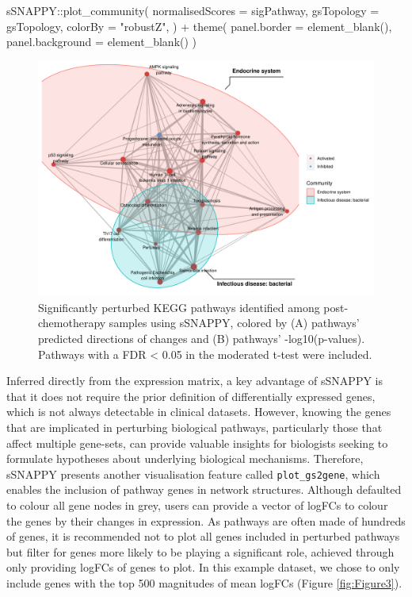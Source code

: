 \documentclass[9pt,a4paper,]{extarticle}
\newenvironment{Shaded}{\begin{snugshade}}{\end{snugshade}}
\newcommand{\AttributeTok}[1]{\textcolor[rgb]{0.77,0.63,0.00}{#1}}
\newcommand{\FunctionTok}[1]{\textcolor[rgb]{0.00,0.00,0.00}{#1}}
\newcommand{\NormalTok}[1]{#1}
\newcommand{\SpecialCharTok}[1]{\textcolor[rgb]{0.00,0.00,0.00}{#1}}
\newcommand{\StringTok}[1]{\textcolor[rgb]{0.31,0.60,0.02}{#1}}
\begin{document}
\begin{Shaded}
\begin{Highlighting}[]
\NormalTok{sSNAPPY}\SpecialCharTok{::}\FunctionTok{plot\_community}\NormalTok{(}
    \AttributeTok{normalisedScores =}\NormalTok{ sigPathway, }
        \AttributeTok{gsTopology =}\NormalTok{ gsTopology, }
        \AttributeTok{colorBy =} \StringTok{"robustZ"}\NormalTok{, }
\NormalTok{    ) }\SpecialCharTok{+}
    \FunctionTok{theme}\NormalTok{(}
        \AttributeTok{panel.border =} \FunctionTok{element\_blank}\NormalTok{(), }
        \AttributeTok{panel.background =} \FunctionTok{element\_blank}\NormalTok{()}
\NormalTok{    )}
\end{Highlighting}
\end{Shaded}

\begin{figure}

{\centering \includegraphics[width=0.8\linewidth]{sSNAPPY_paper_files/figure-latex/Figure2-1} 

}

\caption{Significantly perturbed KEGG pathways identified among post-chemotherapy samples using sSNAPPY, colored by (A) pathways’ predicted directions of changes and (B) pathways’ -log10(p-values). Pathways with a FDR < 0.05 in the moderated t-test were included.}\label{fig:Figure2}
\end{figure}

Inferred directly from the expression matrix, a key advantage of sSNAPPY is that it does not require the prior definition of differentially expressed genes, which is not always detectable in clinical datasets. However, knowing the genes that are implicated in perturbing biological pathways, particularly those that affect multiple gene-sets, can provide valuable insights for biologists seeking to formulate hypotheses about underlying biological mechanisms. Therefore, sSNAPPY presents another visualisation feature called \texttt{plot\_gs2gene}, which enables the inclusion of pathway genes in network structures. Although defaulted to colour all gene nodes in grey, users can provide a vector of logFCs to colour the genes by their changes in expression. As pathways are often made of hundreds of genes, it is recommended not to plot all genes included in perturbed pathways but filter for genes more likely to be playing a significant role, achieved through only providing logFCs of genes to plot. In this example dataset, we chose to only include genes with the top 500 magnitudes of mean logFCs (Figure \ref{fig:Figure3}).
\end{document}
